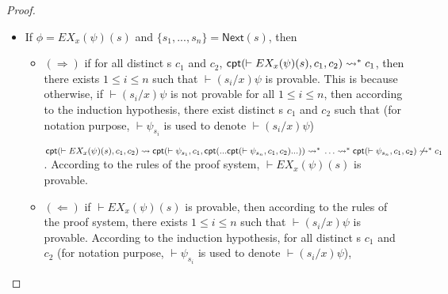 \begin{proof}
\begin{itemize}
\begin{itemize}
			$\textsf{cpt}(\vdash
			AX_x(\psi)(s), c_1, c_2)\rsa$ \\
			$\textsf{cpt}(\vdash\psi_{s_1},
			\textsf{cpt}(...\textsf{cpt}(\vdash\psi_{s_n}, c_1,
			c_2)...), c_2)\rsa^*\\
			\ldots\rsa^*\\
			\textsf{cpt}(\vdash\psi_{s_j},
			\textsf{cpt}(...\textsf{cpt}(\vdash\psi_{s_n}, c_1,
			c_2)...), c_2)\rsa^*\\
			\textsf{cpt}(\vdash\psi_{s_i},
			\textsf{cpt}(...\textsf{cpt}(\vdash\psi_{s_n}, c_1,
			c_2)...), c_2)\not\rsa^*\\
			c_1$. Thus, according to the rules of the proof system, $\vdash AX_x(\psi)(s)$ is provable.
			\item $(\Leftarrow)$ if $\vdash AX_x(\psi)(s)$ is provable, then according to the rules of the proof system, $\vdash(s_1/x)\psi,...,\vdash(s_n/x)\psi$ are all provable, then according to the induction hypothesis, for all distinct \CPT{}s $c_1$ and $c_2$ (for notation purpose, $\vdash\psi_{s_i}$ is used to denote $\vdash(s_i/x)\psi$), 
			
			$\textsf{cpt}(\vdash
			AX_x(\psi)(s), c_1, c_2)\rsa$ \\
			$\textsf{cpt}(\vdash\psi_{s_1},
			\textsf{cpt}(...\textsf{cpt}(\vdash\psi_{s_n}, c_1,
			c_2)...), c_2)\rsa^*\\
			\ldots\rsa^*\\
			\textsf{cpt}(\vdash\psi_{s_n}, c_1,
			c_2)\rsa^*c_1$.
		\end{itemize}
		
		\item If $\phi = EX_x(\psi)(s)$ and $\{s_1,...,s_n\}=\textsf{Next}(s)$, then
		\begin{itemize}
			\item $(\Rightarrow)$ if for all distinct \CPT{}s $c_1$ and $c_2$, $\textsf{cpt}(\vdash EX_x(\psi)(s), c_1, c_2)\rightsquigarrow^* c_1$, then there exists $1\le i\le n$ such that $\vdash(s_i/x)\psi$ is provable. This is because otherwise, if $\vdash(s_i/x)\psi$ is not provable for all $1\le i\le n$, then according to the induction hypothesis, there exist distinct \CPT{}s $c_1$ and $c_2$ such that (for notation purpose, $\vdash\psi_{s_i}$ is used to denote $\vdash(s_i/x)\psi$)
			
			$\textsf{cpt}(\vdash
			EX_x(\psi)(s), c_1, c_2)\rightsquigarrow \\ 
			\textsf{cpt}(\vdash \psi_{s_1}, c_1,
			\textsf{cpt}(...\textsf{cpt}(\vdash\psi_{s_n}, c_1,
			c_2)...))\rightsquigarrow^* \\ 
			\ldots \rightsquigarrow^*\\
			\textsf{cpt}(\vdash\psi_{s_n}, c_1, c_2)\not\rightsquigarrow^* c_1$. According to the rules of the proof system, $\vdash EX_x(\psi)(s)$ is provable.
			\item $(\Leftarrow)$ if $\vdash EX_x(\psi)(s)$ is provable, then according to the rules of the proof system, there exists $1\le i\le n$ such that $\vdash (s_i/x)\psi$ is provable. According to the induction hypothesis, for all distinct \CPT{}s $c_1$ and $c_2$ (for notation purpose, $\vdash\psi_{s_i}$ is used to denote $\vdash(s_i/x)\psi$), 
			

\end{itemize}
\end{itemize}
\end{proof}
